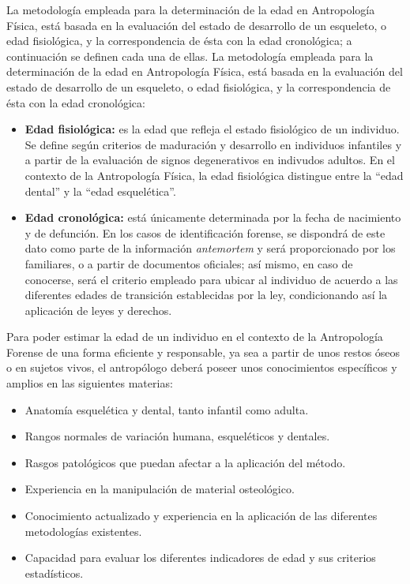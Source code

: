 \documentclass[a4paper,11pt]{article}
\begin{document}
La metodología empleada para la determinación de la edad en Antropología Física, está basada en la evaluación del estado de desarrollo de un esqueleto, o edad fisiológica, y la correspondencia de ésta con la edad cronológica; a continuación se definen cada una de ellas.
La metodología empleada para la determinación de la edad en Antropología Física, está basada en la evaluación del estado de desarrollo de un esqueleto, o edad fisiológica, y la correspondencia de ésta con la edad cronológica:
\begin{itemize}
\item {\bf Edad fisiológica:} es la edad que refleja el estado fisiológico de un individuo. Se define según criterios de maduración y desarrollo en individuos infantiles y a partir de la evaluación de signos degenerativos en indivudos adultos. En el contexto de la Antropología Física, la edad fisiológica distingue entre la “edad dental” y la “edad esquelética”.
\item {\bf Edad cronológica:} está únicamente determinada por la fecha de nacimiento y de defunción. En los casos de identificación forense, se dispondrá de este dato como parte de la información {\em antemortem} y será proporcionado por los familiares, o a partir de documentos oficiales; así mismo, en caso de conocerse, será el criterio empleado para ubicar al individuo de acuerdo a las diferentes edades de transición establecidas por la ley, condicionando así la aplicación de leyes y derechos.
\end{itemize}
Para poder estimar la edad de un individuo en el contexto de la Antropología Forense de una forma eficiente y responsable, ya sea a partir de unos restos óseos o en sujetos vivos, el antropólogo deberá poseer unos conocimientos específicos y amplios en las siguientes materias:
\begin{itemize}
\item Anatomía esquelética y dental, tanto infantil como adulta.
\item Rangos normales de variación humana, esqueléticos y dentales.
\item Rasgos patológicos que puedan afectar a la aplicación del método.
\item Experiencia en la manipulación de material osteológico.
\item Conocimiento actualizado y experiencia en la aplicación de las diferentes metodologías existentes.
\item Capacidad para evaluar los diferentes indicadores de edad y sus criterios estadísticos.
\end{itemize}
\end{document}
